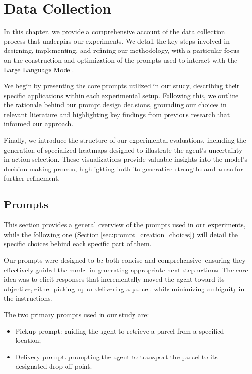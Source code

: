 \chapter{Data Collection}
\label{cha:data_collection}

In this chapter, we provide a comprehensive account of the data collection process
that underpins our experiments. We detail the key steps involved in designing, implementing,
and refining our methodology, with a particular focus on the construction and optimization
of the prompts used to interact with the Large Language Model.

We begin by presenting the core prompts utilized in our study, describing their
specific applications within each experimental setup. Following this, we outline
the rationale behind our prompt design decisions, grounding our choices in relevant
literature and highlighting key findings from previous research that informed our
approach.

Finally, we introduce the structure of our experimental evaluations, including the
generation of specialized heatmaps designed to illustrate the agent's uncertainty
in action selection. These visualizations provide valuable insights into the
model's decision-making process, highlighting both its generative strengths and areas
for further refinement.

\section{Prompts}
\label{sec:prompts}

This section provides a general overview of the prompts used in our experiments,
while the following one (Section \ref{sec:prompt_creation_choices}) will detail the
specific choices behind each specific part of them.

Our prompts were designed to be both concise and comprehensive, ensuring they
effectively guided the model in generating appropriate next-step actions. The core
idea was to elicit responses that incrementally moved the agent toward its objective,
either picking up or delivering a parcel, while minimizing ambiguity in the instructions.

The two primary prompts used in our study are:
\begin{itemize}
  \item Pickup prompt: guiding the agent to retrieve a parcel from a specified
    location;

  \item Delivery prompt: prompting the agent to transport the parcel to its
    designated drop-off point.
\end{itemize}

